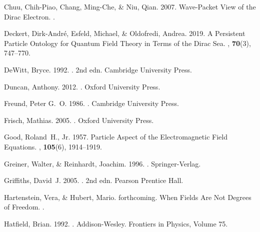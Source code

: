 \documentclass[onecolumn,secnumarabic,amsmath,amssymb,balancelastpage,nofootinbib]{article}
\begin{document}
\begin{thebibliography}{}
Chuu, Chih-Piao, Chang, Ming-Che, \& Niu, Qian. 2007.
\newblock Wave-Packet View of the Dirac Electron.
.

Deckert, Dirk-Andr\'{e}, Esfeld, Michael, \& Oldofredi, Andrea. 2019.
\newblock A Persistent Particle Ontology for Quantum Field Theory in Terms of
  the Dirac Sea.
, {\bf 70}(3),
  747--770.

DeWitt, Bryce. 1992.
. 2nd edn.
\newblock Cambridge University Press.

Duncan, Anthony. 2012.
.
\newblock Oxford University Press.

Freund, Peter G.~O. 1986.
.
\newblock Cambridge University Press.

Frisch, Mathias. 2005.
.
\newblock Oxford University Press.

Good, Roland~H., Jr. 1957.
\newblock Particle Aspect of the Electromagnetic Field Equations.
, {\bf 105}(6), 1914--1919.

Greiner, Walter, \& Reinhardt, Joachim. 1996.
.
\newblock Springer-Verlag.

Griffiths, David~J. 2005.
. 2nd edn.
\newblock Pearson Prentice Hall.

Hartenstein, Vera, \& Hubert, Mario. forthcoming.
\newblock When Fields Are Not Degrees of Freedom.
.

Hatfield, Brian. 1992.
.
\newblock Addison-Wesley.
\newblock Frontiers in Physics, Volume 75.


\end{thebibliography}
\end{document}
